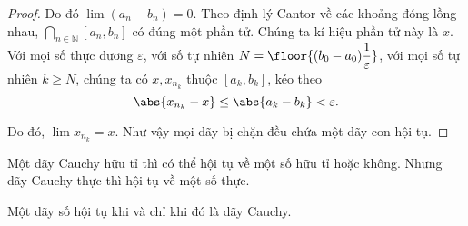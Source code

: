 \begin{proof}
    Do đó $\lim (a_{n} - b_{n}) = 0$. Theo định lý Cantor về các khoảng đóng lồng nhau, $\bigcap_{n\in\mathbb{N}} [a_{n}, b_{n}]$ có đúng một phần tử. Chúng ta kí hiệu phần tử này là $x$.  Với mọi số thực dương $\varepsilon$, với số tự nhiên $N = \floor{(b_{0} - a_{0})\dfrac{1}{\varepsilon}}$, với mọi số tự nhiên ${k}\geq N$, chúng ta có $x, x_{n_{k}}$ thuộc $[a_{k}, b_{k}]$, kéo theo
    \[
        \abs{x_{n_{k}} - x}\leq \abs{a_{k} - b_{k}} < \varepsilon.
    \]

    Do đó, $\lim x_{n_{k}} = x$. Như vậy mọi dãy bị chặn đều chứa một dãy con hội tụ.
\end{proof}

Một dãy Cauchy hữu tỉ thì có thể hội tụ về một số hữu tỉ hoặc không. Nhưng dãy Cauchy thực thì hội tụ về một số thực.
\begin{theorem}
    Một dãy số hội tụ khi và chỉ khi đó là dãy Cauchy.
\end{theorem}

